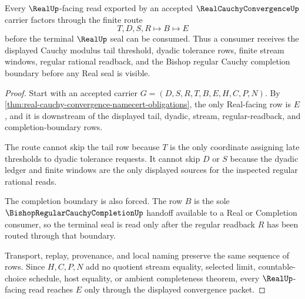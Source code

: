 \begin{theorem}
\label{thm:real-cauchy-convergence-regular-seal}
Every $\RealUp$-facing read exported by an accepted $\RealCauchyConvergenceUp$ carrier factors through the finite route
$$
T,D,S,R \longmapsto B \longmapsto E
$$
before the terminal $\RealUp$ seal can be consumed. Thus a consumer receives the displayed Cauchy modulus tail threshold, dyadic tolerance rows, finite stream windows, regular rational readback, and the Bishop regular Cauchy completion boundary before any Real seal is visible.
\end{theorem}
\begin{proof}
Start with an accepted carrier $G=(D,S,R,T,B,E,H,C,P,N)$. By \autoref{thm:real-cauchy-convergence-namecert-obligations}, the only Real-facing row is $E$, and it is downstream of the displayed tail, dyadic, stream, regular-readback, and completion-boundary rows.

The route cannot skip the tail row because $T$ is the only coordinate assigning late thresholds to dyadic tolerance requests. It cannot skip $D$ or $S$ because the dyadic ledger and finite windows are the only displayed sources for the inspected regular rational reads.

The completion boundary is also forced. The row $B$ is the sole $\BishopRegularCauchyCompletionUp$ handoff available to a Real or Completion consumer, so the terminal seal is read only after the regular readback $R$ has been routed through that boundary.

Transport, replay, provenance, and local naming preserve the same sequence of rows. Since $H,C,P,N$ add no quotient stream equality, selected limit, countable-choice schedule, host equality, or ambient completeness theorem, every $\RealUp$-facing read reaches $E$ only through the displayed convergence packet.
\end{proof}


